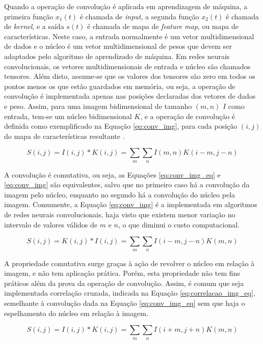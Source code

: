 Quando a operação de convolução é aplicada em aprendizagem de máquina, a primeira função $x_1(t)$ é chamada de \emph{input}, a segunda função $x_2(t)$ é chamada de \emph{kernel}, e a saída $s(t)$ é chamada de mapa de \emph{feature map}, ou mapa de características. Neste caso, a entrada normalmente é um vetor multidimensional de dados e o núcleo é um vetor multidimensional de pesos que devem ser adaptados pelo algoritmo de aprendizado de máquina. Em redes neurais convolucionais, os vetores multidimensionais de entrada e núcleo são chamados tensores. Além disto, assume-se que os valores dos tensores são zero em todos os pontos menos os que estão guardados em memória, ou seja, a operação de convolução é implementada apenas nas posições declaradas dos vetores de dados e peso. Assim, para uma imagem bidimensional de tamanho $(m,n)$ $I$ como entrada, tem-se um núcleo bidimensional $K$, e a operação de convolução é definida como exemplificado na Equação \ref{eq:conv_img}, para cada posição $(i,j)$ do mapa de características resultante \cite{goodfellow2016deep}.

\begin{equation}\label{eq:conv_img}
	S(i,j) = I(i,j)*K(i,j) = \sum_{m}\sum_{n}I(m,n)K(i-m,j-n)
\end{equation}

A convolução é comutativa, ou seja, as Equações \ref{eq:conv_img_eq} e \ref{eq:conv_img} são equivalentes, salvo que no primeiro caso há a convolução da imagem pelo núcleo, enquanto no segundo há a convolução do núcleo pela imagem. Comumente, a Equação \ref{eq:conv_img} é a implementada em algoritmos de redes neurais convolucionais, haja visto que existem menor variação no intervalo de valores válidos de $m$ e $n$, o que diminui o custo computacional.

\begin{equation}\label{eq:conv_img_eq}
	S(i,j) = K(i,j)*I(i,j) = \sum_{m}\sum_{n}I(i-m,j-n)K(m,n)
\end{equation}

A propriedade comutativa surge graças à ação de revolver o núcleo em relação à imagem, e não tem aplicação prática. Porém, esta propriedade não tem fins práticos além da prova da operação de convolução. Assim, é comum que seja implementada correlação cruzada, indicada na Equação \ref{eq:correlacao_img_eq}, semelhante à convolução dada na Equação \ref{eq:conv_img_eq} sem que haja o espelhamento do núcleo em relação à imagem.

\begin{equation}\label{eq:correlacao_img_eq}
	S(i,j) = I(i,j)*K(i,j) = \sum_{m}\sum_{n}I(i+m,j+n)K(m,n)
\end{equation}

